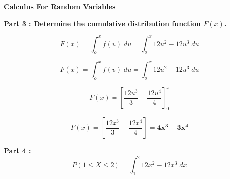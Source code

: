 			
			\noindent \textbf{Calculus For Random Variables}
			
			\textbf{Part 3 : Determine the cumulative distribution function $F(x)$.}
			
			\[F(x) = \int_o^x f(u) \;du  =  \int_o^x 12u^2-12u^3 \;du\]
			
			
			
			
			\[F(x) = \int_o^x f(u) \;du  =  \int_o^x 12u^2-12u^3 \;du\]
			
			\[ F(x) = \left[\frac{12u^3}{3} - \frac{12u^4}{4} \right]^x_0 \]
			
			\[ F(x) = \left[\frac{12x^3}{3} - \frac{12x^4}{4} \right] = \boldsymbol{ 4x^3 - 3x^4 } \]
			
			
			
			\textbf{Part 4 :}
			\[P(1 \leq X \leq 2) =  \int_1^2 12x^2-12x^3 \;dx\]
